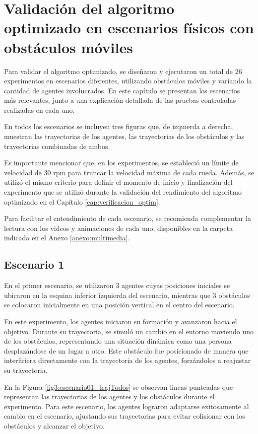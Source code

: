 \chapter{Validación del algoritmo optimizado en escenarios físicos con obstáculos móviles}\label{cap:validacion}
Para validar el algoritmo optimizado, se diseñaron y ejecutaron un total de 26 experimentos en escenarios diferentes, utilizando obstáculos móviles y variando la cantidad de agentes involucrados. En este capítulo se presentan los escenarios más relevantes, junto a una explicación detallada de las pruebas controladas realizadas en cada uno. 

En todos los escenarios se incluyen tres figuras que, de izquierda a derecha, muestran las trayectorias de los agentes, las trayectorias de los obstáculos y las trayectorias combinadas de ambos.

Es importante mencionar que, en los experimentos, se estableció un límite de velocidad de $30$ rpm para truncar la velocidad máxima de cada rueda. Además, se utilizó el mismo criterio para definir el momento de inicio y finalización del experimento que se utilizó durante la validación del rendimiento del algoritmo optimizado en el Capítulo \ref{cap:verificacion_optim}.

Para facilitar el entendimiento de cada escenario, se recomienda complementar la lectura con los videos y animaciones de cada uno, disponibles en la carpeta indicada en el Anexo \ref{anexo:multimedia}.

\newpage
\section{Escenario 1}
En el primer escenario, se utilizaron 3 agentes cuyas posiciones iniciales se ubicaron en la esquina inferior izquierda del escenario, mientras que 3 obstáculos se colocaron inicialmente en una posición vertical en el centro del escenario.

En este experimento, los agentes iniciaron su formación y avanzaron hacia el objetivo. Durante su trayectoria, se simuló un cambio en el entorno moviendo uno de los obstáculos, representando una situación dinámica como una persona desplazándose de un lugar a otro. Este obstáculo fue posicionado de manera que interfiriera directamente con la trayectoria de los agentes, forzándolos a reajustar su trayectoria.

En la Figura \ref{fig3:escenario01_trajTodos} se observan lineas punteadas que representan las trayectorias de los agentes y los obstáculos durante el experimento. Para este escenario, los agentes lograron adaptarse exitosamente al cambio en el escenario, ajustando sus trayectorias para evitar colisionar con los obstáculos y alcanzar el objetivo.

